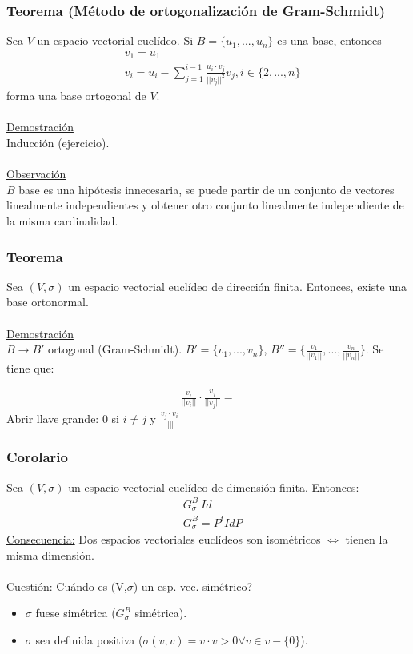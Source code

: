 \documentclass[12pt, a4paper, ones, notitlepage, openany,titlepage]{article}
\newcommand{\demostracion}{\noindent\underline{Demostración}}
\begin{document}
\subsubsection{Teorema (Método de ortogonalización de Gram-Schmidt)}
Sea $V$ un espacio vectorial euclídeo. Si $B = \{u_1,...,u_n\}$ es una base, entonces
\begin{align*}
	&v_1 = u_1 \\
	&v_i = u_i - \sum_{j=1}^{i-1} \frac{u_i \cdot v_j}{||v_j||^2} v_j, i \in \{2,...,n\}
\end{align*}
forma una base ortogonal de $V$.\\\\
\demostracion\\
Inducción (ejercicio).\\\\
\underline{Observación}\\
$B$ base es una hipótesis innecesaria, se puede partir de un conjunto de vectores linealmente independientes y obtener otro conjunto linealmente independiente de la misma cardinalidad.

\subsubsection{Teorema}
Sea $(V,\sigma)$ un espacio vectorial euclídeo de dirección finita. Entonces, existe una base ortonormal.\\\\
\demostracion\\
$B \longrightarrow B'$ ortogonal (Gram-Schmidt). $B'=\{v_1,...,v_n\}$, $B''=\{\frac{v_1}{||v_1||},...,\frac{v_n}{||v_n||}\}$. Se tiene que:

\begin{align*}
	\frac{v_i}{||v_i||} \cdot \frac{v_j}{||v_j||} =
\end{align*}
Abrir llave grande: $0$ si $i \ne j$ y $\frac{v_j \cdot v_i}{||||}$

\subsubsection{Corolario}
Sea $(V,\sigma)$ un espacio vectorial euclídeo de dimensión finita. Entonces:
\begin{align*}
	& G_\sigma^B ~ Id \\
	& G_\sigma^B = P^tIdP
\end{align*}
\underline{Consecuencia:} Dos espacios vectoriales euclídeos son isométricos $\Longleftrightarrow$ tienen la misma dimensión.\\\\
\underline{Cuestión:} Cuándo es (V,$\sigma$) un esp. vec. simétrico?
\begin{itemize}
	\item $\sigma$ fuese simétrica ($G_\sigma^B$ simétrica).
	\item $\sigma$ sea definida positiva ($\sigma(v,v)=v \cdot v > 0 \forall v \in v - \{0\}$).
\end{itemize}
\end{document}
